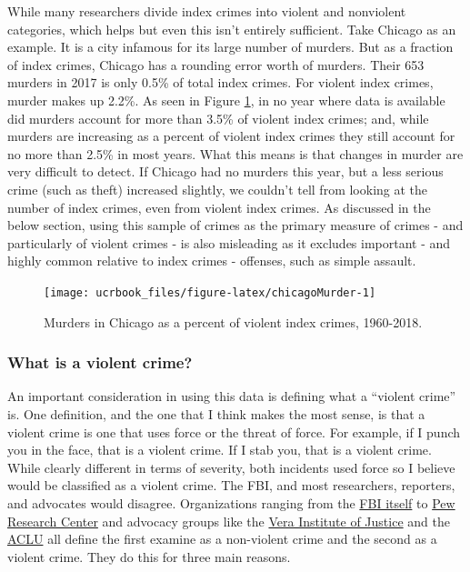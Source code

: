 \documentclass[
  12pt,
  openany]{book}
\begin{document}
While many researchers divide index crimes into violent and nonviolent categories, which helps but even this isn't entirely sufficient. Take Chicago as an example. It is a city infamous for its large number of murders. But as a fraction of index crimes, Chicago has a rounding error worth of murders. Their 653 murders in 2017 is only 0.5\% of total index crimes. For violent index crimes, murder makes up 2.2\%. As seen in Figure \ref{fig:chicagoMurder}, in no year where data is available did murders account for more than 3.5\% of violent index crimes; and, while murders are increasing as a percent of violent index crimes they still account for no more than 2.5\% in most years. What this means is that changes in murder are very difficult to detect. If Chicago had no murders this year, but a less serious crime (such as theft) increased slightly, we couldn't tell from looking at the number of index crimes, even from violent index crimes. As discussed in the below section, using this sample of crimes as the primary measure of crimes - and particularly of violent crimes - is also misleading as it excludes important - and highly common relative to index crimes - offenses, such as simple assault.

\begin{figure}

{\centering \texttt{[image: ucrbook\_files/figure-latex/chicagoMurder-1]} 

}

\caption{Murders in Chicago as a percent of violent index crimes, 1960-2018.}\label{fig:chicagoMurder}
\end{figure}

\hypertarget{what-is-a-violent-crime}{%
\subsubsection{What is a violent crime?}\label{what-is-a-violent-crime}}

An important consideration in using this data is defining what a ``violent crime'' is. One definition, and the one that I think makes the most sense, is that a violent crime is one that uses force or the threat of force. For example, if I punch you in the face, that is a violent crime. If I stab you, that is a violent crime. While clearly different in terms of severity, both incidents used force so I believe would be classified as a violent crime. The FBI, and most researchers, reporters, and advocates would disagree. Organizations ranging from the \href{https://ucr.fbi.gov/crime-in-the-u.s/2019/crime-in-the-u.s.-2019/topic-pages/violent-crime}{FBI itself} to \href{https://www.pewresearch.org/fact-tank/2020/11/20/facts-about-crime-in-the-u-s/}{Pew Research Center} and advocacy groups like the \href{https://arresttrends.vera.org/data-sources-methodology}{Vera Institute of Justice} and the \href{https://www.aclu.org/report/tale-two-countries-racially-targeted-arrests-era-marijuana-reform}{ACLU} all define the first examine as a non-violent crime and the second as a violent crime. They do this for three main reasons.
\end{document}
